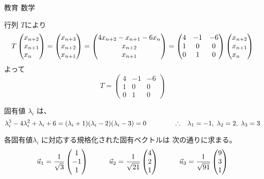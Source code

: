 \documentclass[fleqn]{jbook}
\begin{document}
\begin{answer}{教育 数学}{}

\begin{subanswers}
\SubAnswer

  \begin{subsubanswers}
  \SubSubAnswer
    行列 $T$により
%
    \[ T \vect{x_{n+2}}{x_{n+1}}{x_{n}\hfill}%
       = \vect{x_{n+3}}{x_{n+2}}{x_{n+1}}%
       = \vect{4x_{n+2}-x_{n+1}-6x_{n}}{x_{n+2}}{x_{n+1}}%
       = \begin{pmatrix}%
           4  & -1 & -6 \\
           1  &  0 & 0  \\
           0  &  1 & 0 \end{pmatrix}%
        \vect{x_{n+2}}{x_{n+1}}{x_{n}\hfill}
    \]
%
    よって
%
    \[ T= \begin{pmatrix}%
           4  & -1 & -6 \\
           1  &  0 & 0  \\
           0  &  1 & 0 \end{pmatrix}%
    \]


  \SubSubAnswer
    固有値 $\lambda_i$ は、
%
    \[ \lambda_i^3 - 4\lambda_i^2 + \lambda_i + 6%
       = (\lambda_i +1)(\lambda_i -2)(\lambda_i -3) = 0  \hspace{15mm}%
       \Yueni \lambda_1=-1,\; \lambda_2=2,\; \lambda_3=3 \]

  \SubSubAnswer
    各固有値$\lambda_i$ に対応する規格化された固有ベクトルは
    次の通りに求まる。
%
    \[ \vec{u}_1=\frac{1}{\sqrt{ 3}} \vect{1}{-1}{1} \hspace{10mm}%
       \vec{u}_2=\frac{1}{\sqrt{21}} \vect{4}{2}{1} \hspace{10mm}%
       \vec{u}_3=\frac{1}{\sqrt{91}} \vect{9}{3}{1} \]


\end{subsubanswers}
\end{subanswers}
\end{answer}
\end{document}
